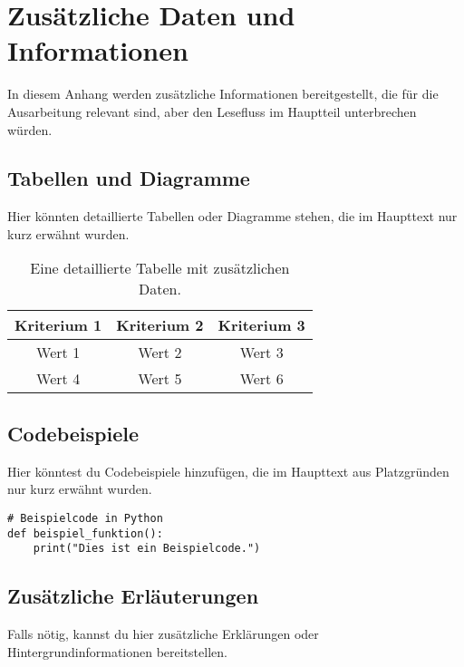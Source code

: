 
\chapter{Zusätzliche Daten und Informationen}
\label{appendix_a}

In diesem Anhang werden zusätzliche Informationen bereitgestellt, die für die Ausarbeitung relevant sind, aber den Lesefluss im Hauptteil unterbrechen würden.

\section{Tabellen und Diagramme}

Hier könnten detaillierte Tabellen oder Diagramme stehen, die im Haupttext nur kurz erwähnt wurden.

\begin{table}[h!]
\centering
\begin{tabular}{|c|c|c|}
\hline
Kriterium 1 & Kriterium 2 & Kriterium 3 \\ \hline
Wert 1     & Wert 2     & Wert 3     \\ \hline
Wert 4     & Wert 5     & Wert 6     \\ \hline
\end{tabular}
\caption{Eine detaillierte Tabelle mit zusätzlichen Daten.}
\label{tab:appendix_table}
\end{table}

\section{Codebeispiele}

Hier könntest du Codebeispiele hinzufügen, die im Haupttext aus Platzgründen nur kurz erwähnt wurden.

\begin{verbatim}
# Beispielcode in Python
def beispiel_funktion():
    print("Dies ist ein Beispielcode.")
\end{verbatim}

\section{Zusätzliche Erläuterungen}

Falls nötig, kannst du hier zusätzliche Erklärungen oder Hintergrundinformationen bereitstellen.

